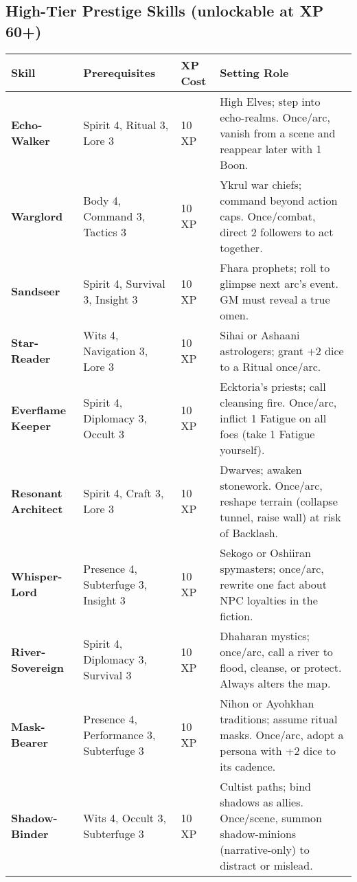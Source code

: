 \documentclass[12pt]{article}
\begin{document}
\subsection*{High-Tier Prestige Skills (unlockable at XP 60+)}

\begin{tabular}{@{}llll@{}}
\toprule
\textbf{Skill} & \textbf{Prerequisites} & \textbf{XP Cost} & \textbf{Setting Role} \\
\midrule
\textbf{Echo-Walker} & Spirit 4, Ritual 3, Lore 3 & 10 XP & High Elves; step into echo-realms. Once/arc, vanish from a scene and reappear later with 1 Boon. \\
\textbf{Warglord} & Body 4, Command 3, Tactics 3 & 10 XP & Ykrul war chiefs; command beyond action caps. Once/combat, direct 2 followers to act together. \\
\textbf{Sandseer} & Spirit 4, Survival 3, Insight 3 & 10 XP & Fhara prophets; roll to glimpse next arc’s event. GM must reveal a true omen. \\
\textbf{Star-Reader} & Wits 4, Navigation 3, Lore 3 & 10 XP & Sihai or Ashaani astrologers; grant +2 dice to a Ritual once/arc. \\
\textbf{Everflame Keeper} & Spirit 4, Diplomacy 3, Occult 3 & 10 XP & Ecktoria’s priests; call cleansing fire. Once/arc, inflict 1 Fatigue on all foes (take 1 Fatigue yourself). \\
\textbf{Resonant Architect} & Spirit 4, Craft 3, Lore 3 & 10 XP & Dwarves; awaken stonework. Once/arc, reshape terrain (collapse tunnel, raise wall) at risk of Backlash. \\
\textbf{Whisper-Lord} & Presence 4, Subterfuge 3, Insight 3 & 10 XP & Sekogo or Oshiiran spymasters; once/arc, rewrite one fact about NPC loyalties in the fiction. \\
\textbf{River-Sovereign} & Spirit 4, Diplomacy 3, Survival 3 & 10 XP & Dhaharan mystics; once/arc, call a river to flood, cleanse, or protect. Always alters the map. \\
\textbf{Mask-Bearer} & Presence 4, Performance 3, Subterfuge 3 & 10 XP & Nihon or Ayohkhan traditions; assume ritual masks. Once/arc, adopt a persona with +2 dice to its cadence. \\
\textbf{Shadow-Binder} & Wits 4, Occult 3, Subterfuge 3 & 10 XP & Cultist paths; bind shadows as allies. Once/scene, summon shadow-minions (narrative-only) to distract or mislead. \\
\bottomrule
\end{tabular}
\end{document}
